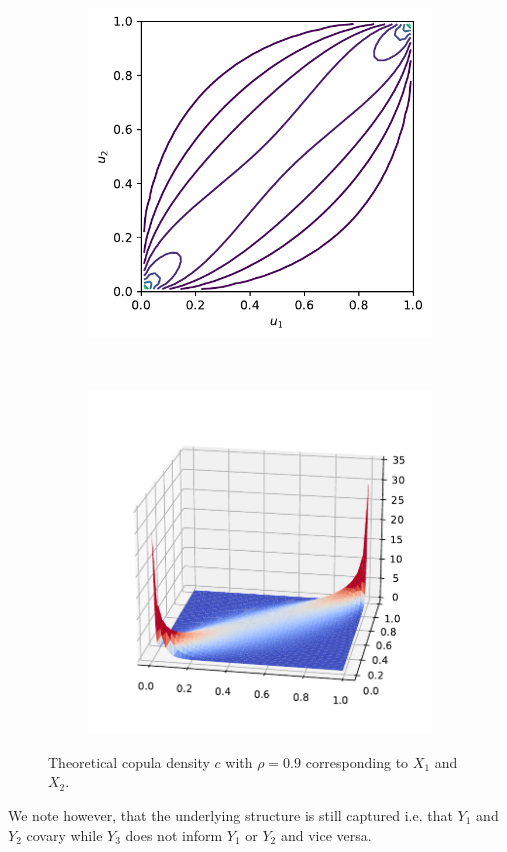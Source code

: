 \documentclass[../Thesis.tex]{subfiles}
\begin{document}
\begin{example}
\begin{figure}[H]
\begin{subfigure}[t]{0.45\linewidth}
            \includegraphics[width = \linewidth]{figures/ND examples/Gaussian copula theoretical contour.pdf}
            \caption{}
        \end{subfigure}%
        ~
        \begin{subfigure}[t]{0.5\linewidth}
            \includegraphics[width = \linewidth]{figures/ND examples/Gaussian copula theoretical pdf.pdf}
            \caption{}
        \end{subfigure}
        \caption{Theoretical copula density $c$ with $\rho = 0.9$ corresponding to $X_1$ and $X_2$.}
        \label{fig:gaussian copula truth}
    \end{figure}
    We note however, that the underlying structure is still captured i.e. that $Y_1$ and $Y_2$ covary while $Y_3$ does not inform $Y_1$ or $Y_2$ and vice versa.
\end{example}
\end{document}
